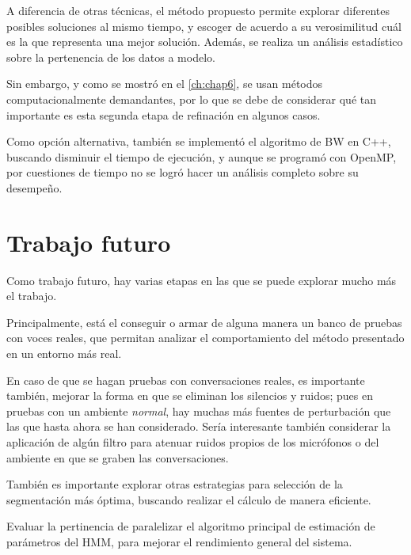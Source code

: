 A diferencia de otras técnicas, el método propuesto permite explorar diferentes posibles soluciones al mismo tiempo, y escoger de acuerdo a su verosimilitud cuál es la que representa una mejor solución. Además, se realiza un análisis estadístico sobre la pertenencia de los datos a modelo. 

Sin embargo, y como se mostró en el \autoref{ch:chap6}, se usan métodos computacionalmente demandantes, por lo que se debe de considerar qué tan importante es esta segunda etapa de refinación en algunos casos.

Como opción alternativa, también se implementó el algoritmo de \acf{BW} en C++, buscando disminuir el tiempo de ejecución, y aunque se programó con OpenMP, por cuestiones de tiempo no se logró hacer un análisis completo sobre su desempeño. 

\section{Trabajo futuro}

Como trabajo futuro, hay varias etapas en las que se puede explorar mucho más el trabajo. 

Principalmente, está el conseguir o armar de alguna manera un banco de pruebas con voces reales, que permitan analizar el comportamiento del método presentado en un entorno más real.

En caso de que se hagan pruebas con conversaciones reales, es importante también, mejorar la forma en que se eliminan los silencios y ruidos; pues en pruebas con un ambiente \textit{normal}, hay muchas más fuentes de perturbación que las que hasta ahora se han considerado. Sería interesante también considerar la aplicación de algún filtro para atenuar ruidos propios de los micrófonos o del ambiente en que se graben las conversaciones.

También es importante explorar otras estrategias para selección de la segmentación más óptima, buscando realizar el cálculo de manera eficiente.

Evaluar la pertinencia de paralelizar el algoritmo principal de estimación de parámetros del \ac{HMM}, para mejorar el rendimiento general del sistema.




